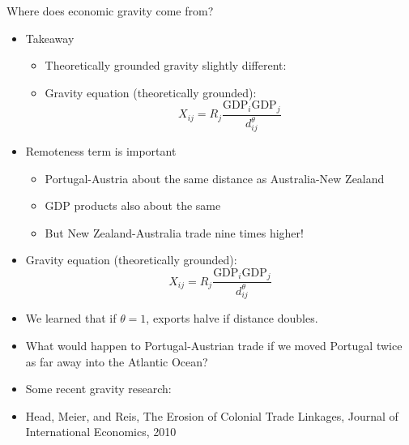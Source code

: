 \documentclass[ignorenonframetext,]{beamer}
\begin{document}
\begin{frame}{Where does economic gravity come from?}

    \begin{itemize}
        \item Takeaway 
        \begin{itemize}
            \item Theoretically grounded gravity slightly different:
            \item Gravity equation (theoretically grounded):
            \begin{equation*}
                X_{ij} = R_j \frac{\mbox{GDP}_i \mbox{GDP}_j}{d_{ij}^\theta}
            \end{equation*}
        \end{itemize}
        \item Remoteness term is important
        \begin{itemize}
            \item Portugal-Austria about the same distance as Australia-New Zealand
            \item GDP products also about the same 
            \item But New Zealand-Australia trade nine times higher!
        \end{itemize}
    \end{itemize}

\end{frame}

\begin{frame}
    
    \begin{itemize}
        \item Gravity equation (theoretically grounded):
        \begin{equation*}
            X_{ij} = R_j \frac{\mbox{GDP}_i \mbox{GDP}_j}{d_{ij}^\theta}
        \end{equation*}
        \item We learned that if $\theta = 1$, exports halve if distance doubles.
        \item What would happen to Portugal-Austrian trade if we moved Portugal twice as far away into the Atlantic Ocean?  
    \end{itemize}

\end{frame}

\begin{frame}

    \begin{itemize}
        \item Some recent gravity research:
        \item Head, Meier, and Reis, The Erosion of Colonial Trade Linkages, Journal of International Economics, 2010
    \end{itemize}

\end{frame}
\end{document}
